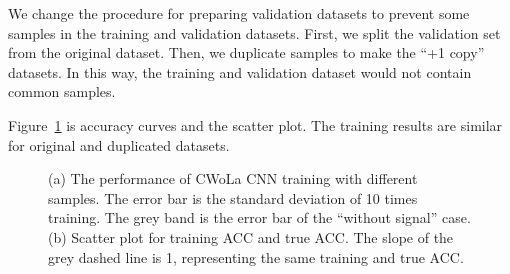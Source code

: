 \documentclass[12pt]{article}
\begin{document}
        We change the procedure for preparing validation datasets to prevent some samples in the training and validation datasets. First, we split the validation set from the original dataset. Then, we duplicate samples to make the ``+1 copy'' datasets. In this way, the training and validation dataset would not contain common samples.

        Figure~\ref{fig:acc_curve_split_validation_first} is accuracy curves and the scatter plot. The training results are similar for original and duplicated datasets.
        \begin{figure}[htpb]
            \centering
            \caption{(a) The performance of CWoLa CNN training with different samples. The error bar is the standard deviation of 10 times training. The grey band is the error bar of the ``without signal'' case. (b) Scatter plot for training ACC and true ACC. The slope of the grey dashed line is 1, representing the same training and true ACC.}
            \label{fig:acc_curve_split_validation_first}
        \end{figure}
\end{document}
